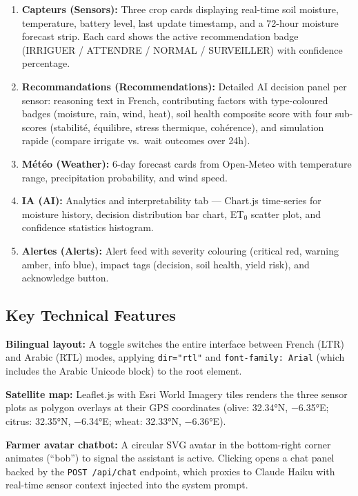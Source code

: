 \documentclass[12pt,a4paper]{report}
\begin{document}
\begin{enumerate}
  \item \textbf{Capteurs (Sensors):} Three crop cards displaying real-time soil moisture, temperature, battery level, last update timestamp, and a 72-hour moisture forecast strip. Each card shows the active recommendation badge (IRRIGUER / ATTENDRE / NORMAL / SURVEILLER) with confidence percentage.
  \item \textbf{Recommandations (Recommendations):} Detailed AI decision panel per sensor: reasoning text in French, contributing factors with type-coloured badges (moisture, rain, wind, heat), soil health composite score with four sub-scores (stabilité, équilibre, stress thermique, cohérence), and simulation rapide (compare irrigate vs.\ wait outcomes over 24h).
  \item \textbf{Météo (Weather):} 6-day forecast cards from Open-Meteo with temperature range, precipitation probability, and wind speed.
  \item \textbf{IA (AI):} Analytics and interpretability tab --- Chart.js time-series for moisture history, decision distribution bar chart, ET$_0$ scatter plot, and confidence statistics histogram.
  \item \textbf{Alertes (Alerts):} Alert feed with severity colouring (critical red, warning amber, info blue), impact tags (decision, soil health, yield risk), and acknowledge button.
\end{enumerate}

\subsection{Key Technical Features}

\textbf{Bilingual layout:} A toggle switches the entire interface between French (LTR) and Arabic (RTL) modes, applying \texttt{dir="rtl"} and \texttt{font-family: Arial} (which includes the Arabic Unicode block) to the root element.

\textbf{Satellite map:} Leaflet.js with Esri World Imagery tiles renders the three sensor plots as polygon overlays at their GPS coordinates (olive: 32.34°N, $-$6.35°E; citrus: 32.35°N, $-$6.34°E; wheat: 32.33°N, $-$6.36°E).

\textbf{Farmer avatar chatbot:} A circular SVG avatar in the bottom-right corner animates (``bob'') to signal the assistant is active. Clicking opens a chat panel backed by the \texttt{POST /api/chat} endpoint, which proxies to Claude Haiku with real-time sensor context injected into the system prompt.
\end{document}
